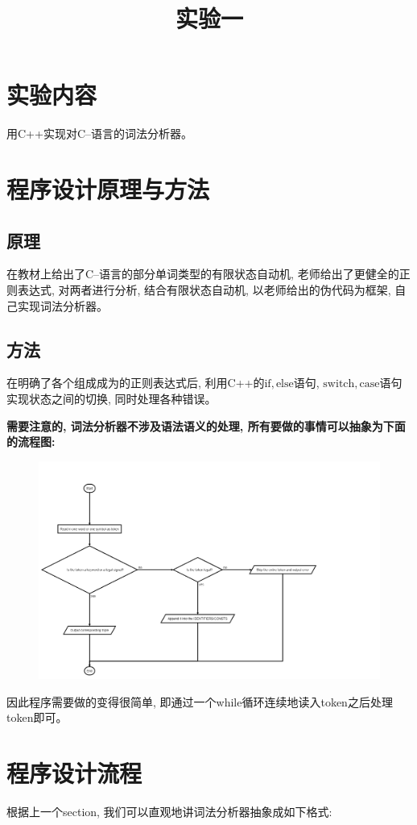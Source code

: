 \documentclass{zpt}
\title{实验一}
\begin{document}
    \maketitle
    \tableofcontents
    \section{实验内容}
    用C++实现对C--语言的词法分析器。
    \section{程序设计原理与方法}
    \subsection{原理}
    在教材上给出了C--语言的部分单词类型的有限状态自动机, 老师给出了更健全的正则表达式, 对两者进行分析, 结合有限状态自动机, 以老师给出的伪代码为框架, 自己实现词法分析器。
    \subsection{方法}
    在明确了各个组成成为的正则表达式后, 利用C++的$\mathrm{if, else}$语句, $\mathrm{switch,case}$语句实现状态之间的切换, 同时处理各种错误。\par
    \textbf{需要注意的, 词法分析器不涉及语法语义的处理, 所有要做的事情可以抽象为下面的流程图:}
    \begin{figure}[H]
        \centering
        \includegraphics[width=\textwidth]{flowchart.png}
    \end{figure}
    因此程序需要做的变得很简单, 即通过一个while循环连续地读入token之后处理token即可。
    \section{程序设计流程}
    根据上一个section, 我们可以直观地讲词法分析器抽象成如下格式:
\end{document}
